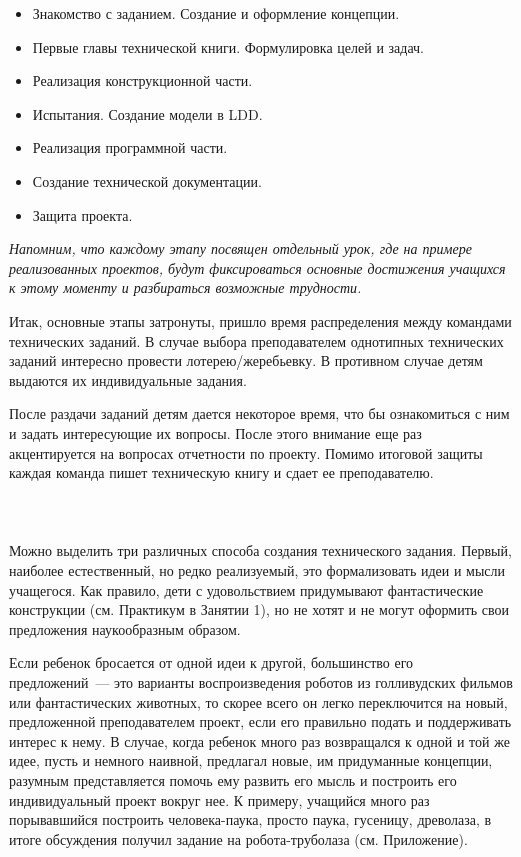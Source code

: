 \begin{itemize}
	\renewcommand{\labelitemi}{\stepcounter{techBooK}\thetechBooK)}
	\item Знакомство с заданием. Создание и оформление концепции.
	\item Первые главы технической книги. Формулировка целей и задач.
	\item Реализация конструкционной части.
	\item Испытания. Создание модели в LDD.
	\item Реализация программной части.
	\item Создание технической документации.
	\item Защита проекта.
\end{itemize}

{\slshape Напомним, что каждому этапу посвящен отдельный урок, где на примере реализованных проектов,   будут фиксироваться основные достижения учащихся к этому моменту и разбираться возможные трудности.}

Итак, основные этапы затронуты, пришло время распределения между командами технических заданий. В случае выбора преподавателем однотипных технических заданий интересно провести лотерею/жеребьевку. В противном случае детям выдаются их индивидуальные задания.

После раздачи заданий детям дается некоторое время, что бы ознакомиться с ним и задать интересующие их вопросы. После этого внимание еще раз акцентируется на вопросах отчетности по проекту. Помимо итоговой защиты каждая команда пишет техническую книгу и сдает ее преподавателю.\\\\

{\hypertarget{lesson23x2}{}}\\\\

Можно выделить три различных способа создания технического задания. Первый, наиболее естественный, но редко реализуемый, это формализовать идеи и мысли учащегося.  Как правило, дети с удовольствием придумывают фантастические конструкции (см. Практикум в Занятии 1),  но не хотят и не могут оформить свои предложения наукообразным образом. 

Если ребенок бросается от одной идеи к другой, большинство его предложений~--- это варианты воспроизведения роботов из голливудских фильмов или фантастических животных, то скорее всего он легко переключится на новый, предложенной преподавателем проект, если его правильно подать и поддерживать интерес к нему. В случае, когда ребенок много раз возвращался к одной и той же идее, пусть и немного наивной, предлагал новые, им придуманные концепции, разумным представляется помочь ему развить его мысль и построить его индивидуальный проект вокруг нее. К примеру, учащийся много раз порывавшийся построить человека-паука, просто паука, гусеницу, древолаза, в итоге обсуждения получил задание на робота-труболаза (см. Приложение).

